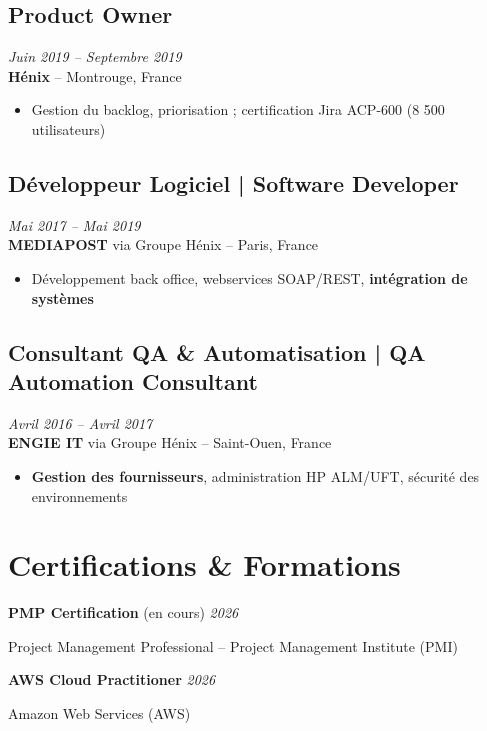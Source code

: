 \documentclass[11pt,a4paper]{article}
\begin{document}
\subsection*{Product Owner} \hfill \textit{Juin 2019 -- Septembre 2019}\\
\textbf{Hénix} -- Montrouge, France\\
\begin{itemize}
    \item Gestion du backlog, priorisation ; certification Jira ACP-600 (8 500 utilisateurs)
\end{itemize}

\subsection*{Développeur Logiciel | Software Developer} \hfill \textit{Mai 2017 -- Mai 2019}\\
\textbf{MEDIAPOST} via Groupe Hénix -- Paris, France\\
\begin{itemize}
    \item Développement back office, webservices SOAP/REST, \textbf{intégration de systèmes}
\end{itemize}

\subsection*{Consultant QA \& Automatisation | QA Automation Consultant} \hfill \textit{Avril 2016 -- Avril 2017}\\
\textbf{ENGIE IT} via Groupe Hénix -- Saint-Ouen, France\\
\begin{itemize}
    \item \textbf{Gestion des fournisseurs}, administration HP ALM/UFT, sécurité des environnements
\end{itemize}

\section*{Certifications \& Formations}

\textbf{PMP Certification} (en cours) \hfill \textit{2026}

Project Management Professional -- Project Management Institute (PMI)

\textbf{AWS Cloud Practitioner} \hfill \textit{2026}

Amazon Web Services (AWS)
\end{document}
